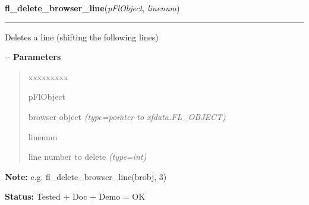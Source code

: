    \vspace{0.5ex}

\hspace{.8\funcindent}\begin{boxedminipage}{\funcwidth}

    \raggedright \textbf{fl\_delete\_browser\_line}(\textit{pFlObject}, \textit{linenum})

    \vspace{-1.5ex}

    \rule{\textwidth}{0.5\fboxrule}
\setlength{\parskip}{2ex}

Deletes a line (shifting the following lines)

-{}-
\setlength{\parskip}{1ex}
      \textbf{Parameters}
      \vspace{-1ex}

      \begin{quote}
        \begin{Ventry}{xxxxxxxxx}

          \item[pFlObject]


browser object
            {\it (type=pointer to xfdata.FL\_OBJECT)}

          \item[linenum]


line number to delete
            {\it (type=int)}

        \end{Ventry}

      \end{quote}

\textbf{Note:} 
e.g. fl\_delete\_browser\_line(brobj, 3)


\textbf{Status:} 
Tested + Doc + Demo = OK


    \end{boxedminipage}

    \label{xformslib:flbrowser:fl_replace_browser_line}

    \vspace{0.5ex}

